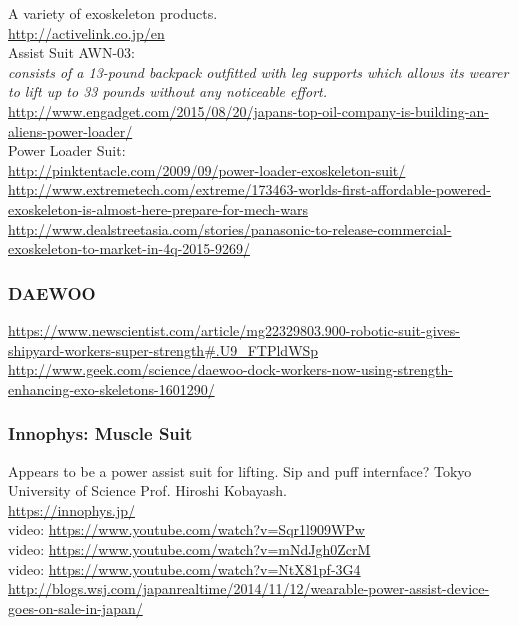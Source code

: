 \noindent
A variety of exoskeleton products.\\
\url{http://activelink.co.jp/en}\\

Assist Suit AWN-03:\\
{\it consists of a 13-pound backpack outfitted with leg supports which allows its wearer to lift up to 33 pounds without any noticeable effort.}\\
\url{http://www.engadget.com/2015/08/20/japans-top-oil-company-is-building-an-aliens-power-loader/}\\

Power Loader Suit:\\
\url{http://pinktentacle.com/2009/09/power-loader-exoskeleton-suit/}\\
\url{http://www.extremetech.com/extreme/173463-worlds-first-affordable-powered-exoskeleton-is-almost-here-prepare-for-mech-wars}\\
\url{http://www.dealstreetasia.com/stories/panasonic-to-release-commercial-exoskeleton-to-market-in-4q-2015-9269/}\\

\subsubsection{DAEWOO}

\noindent
\url{https://www.newscientist.com/article/mg22329803.900-robotic-suit-gives-shipyard-workers-super-strength#.U9_FTPldWSp}\\
\url{http://www.geek.com/science/daewoo-dock-workers-now-using-strength-enhancing-exo-skeletons-1601290/}\\

\subsubsection{Innophys: Muscle Suit}

\noindent
Appears to be a power assist suit for lifting. Sip and puff internface?
Tokyo University of Science Prof. Hiroshi Kobayash.\\
\url{https://innophys.jp/}\\
video: \url{https://www.youtube.com/watch?v=Sqr1l909WPw}\\
video: \url{https://www.youtube.com/watch?v=mNdJgh0ZcrM}\\
video: \url{https://www.youtube.com/watch?v=NtX81pf-3G4}\\
\url{http://blogs.wsj.com/japanrealtime/2014/11/12/wearable-power-assist-device-goes-on-sale-in-japan/}

